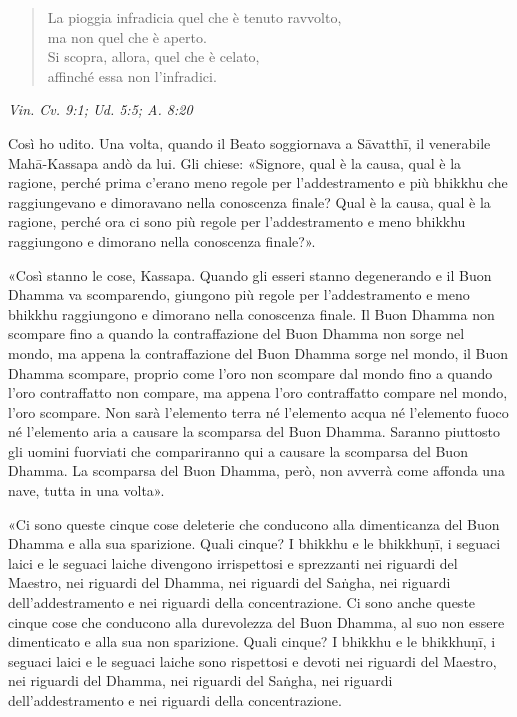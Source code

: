 \begin{quote}
La pioggia infradicia quel che è tenuto ravvolto, \\
ma non quel che è aperto. \\
Si scopra, allora, quel che è celato, \\
affinché essa non l’infradici.
\end{quote}

\emph{Vin. Cv. 9:1; Ud. 5:5; A. 8:20}


 Così ho udito. Una volta, quando il Beato soggiornava a
Sāvatthī, il venerabile Mahā-Kassapa andò da lui. Gli chiese: «Signore,
qual è la causa, qual è la ragione, perché prima c’erano meno regole per
l’addestramento e più bhikkhu che raggiungevano e dimoravano nella
conoscenza finale? Qual è la causa, qual è la ragione, perché ora ci
sono più regole per l’addestramento e meno bhikkhu raggiungono e
dimorano nella conoscenza finale?».


«Così stanno le cose, Kassapa. Quando gli esseri stanno degenerando e il
Buon Dhamma va scomparendo, giungono più regole per l’addestramento e
meno bhikkhu raggiungono e dimorano nella conoscenza finale. Il Buon
Dhamma non scompare fino a quando la contraffazione del Buon Dhamma non
sorge nel mondo, ma appena la contraffazione del Buon Dhamma sorge nel
mondo, il Buon Dhamma scompare, proprio come l’oro non scompare dal
mondo fino a quando l’oro contraffatto non compare, ma appena l’oro
contraffatto compare nel mondo, l’oro scompare. Non sarà l’elemento
terra né l’elemento acqua né l’elemento fuoco né l’elemento aria a
causare la scomparsa del Buon Dhamma. Saranno piuttosto gli uomini
fuorviati che compariranno qui a causare la scomparsa del Buon Dhamma.
La scomparsa del Buon Dhamma, però, non avverrà come affonda una nave,
tutta in una volta».


«Ci sono queste cinque cose deleterie che conducono alla dimenticanza
del Buon Dhamma e alla sua sparizione. Quali cinque? I bhikkhu e le
bhikkhuṇī, i seguaci laici e le seguaci laiche divengono irrispettosi e
sprezzanti nei riguardi del Maestro, nei riguardi del Dhamma, nei
riguardi del Saṅgha, nei riguardi dell’addestramento e nei riguardi
della concentrazione. Ci sono anche queste cinque cose che conducono
alla durevolezza del Buon Dhamma, al suo non essere dimenticato e alla
sua non sparizione. Quali cinque? I bhikkhu e le bhikkhuṇī, i seguaci
laici e le seguaci laiche sono rispettosi e devoti nei riguardi del
Maestro, nei riguardi del Dhamma, nei riguardi del Saṅgha, nei riguardi
dell’addestramento e nei riguardi della concentrazione.


